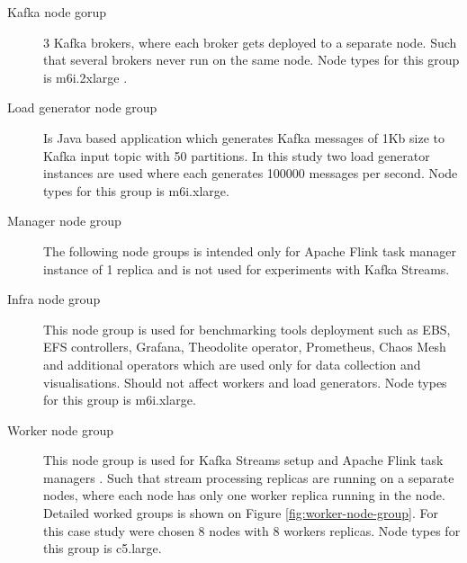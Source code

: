 \begin{description}
    \item[Kafka node gorup] 3 Kafka brokers, where each broker gets deployed to a separate node.
    Such that several brokers never run on the same node.
    Node types for this group is m6i.2xlarge \cite{aws_node_types}.
    \item[Load generator node group] Is Java based application which generates Kafka messages of 1Kb size
    to Kafka input topic with 50 partitions.
    In this study two load generator instances are used where each generates 100000 messages per second.
    Node types for this group is m6i.xlarge.
    \item[Manager node group] The following node groups is intended only for Apache Flink task manager \cite{flinkArchitecture2024} instance of 1 replica
    and is not used for experiments with Kafka Streams.
    \item[Infra node group] This node group is used for benchmarking tools deployment such as EBS, EFS controllers,
    Grafana, Theodolite operator, Prometheus, Chaos Mesh and additional operators which are used only for data collection
    and visualisations.
    Should not affect workers and load generators.
    Node types for this group is m6i.xlarge.
    \item[Worker node group] This node group is used for Kafka Streams setup and Apache Flink task managers \cite{flinkArchitecture2024}.
    Such that stream processing replicas are running on a separate nodes, where each node has only one worker replica
    running in the node.
    Detailed worked groups is shown on Figure \ref{fig:worker-node-group}.
    For this case study were chosen 8 nodes with 8 workers replicas.
    Node types for this group is c5.large.
\end{description}


